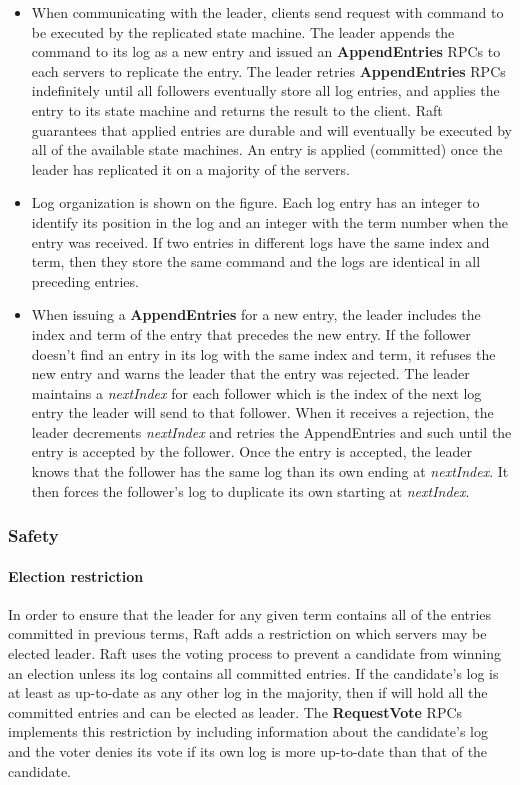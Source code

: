 \begin{itemize}


\item When communicating with the leader, clients send request with command to be executed by the replicated state machine. The leader appends the command to its log as a new entry and issued an \textbf{AppendEntries} RPCs to each servers to replicate the entry. The leader retries \textbf{AppendEntries} RPCs indefinitely until all followers eventually store all log entries, and applies the entry to its state machine and returns the result to the client. Raft guarantees that applied entries are durable and will eventually be executed by all of the available state machines. An entry is applied (committed) once the leader has replicated it on a majority of the servers. 


\item Log organization is shown on the figure. Each log entry has an integer to identify its position in the log and an integer with the term number when the entry was received. If two entries in different logs have the same index and term, then they store the same command and the logs are identical in all preceding entries. 

\item When issuing a \textbf{AppendEntries} for a new entry, the leader includes the index and term of the entry that precedes the new entry. If the follower doesn't find an entry in its log with the same index and term, it refuses the new entry and warns the leader that the entry was rejected. The leader maintains a \textit{nextIndex} for each follower which is the index of the next log entry the leader will send to that follower. When it receives a rejection, the leader decrements \textit{nextIndex} and retries the AppendEntries and such until the entry is accepted by the follower. Once the entry is accepted, the leader knows that the follower has the same log than its own ending at \textit{nextIndex}. It then forces the follower's log to duplicate its own starting at \textit{nextIndex}.

\end{itemize}

\subsubsection{Safety}

\paragraph*{Election restriction}
In order to ensure that the leader for any given term contains all of the entries committed in previous terms, Raft adds a restriction on which servers may be elected leader. Raft uses the voting process to prevent a candidate from winning an election unless its log contains all committed entries. If the candidate's log is at least as up-to-date as any other log in the majority, then if will hold all the committed entries and can be elected as leader. The \textbf{RequestVote} RPCs implements this restriction by including information about the candidate's log and the voter denies its vote if its own log is more up-to-date than that of the candidate. 

